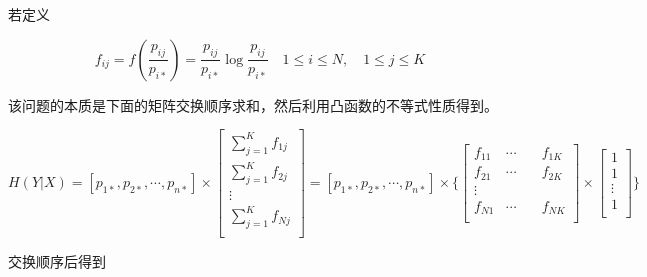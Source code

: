 \begin{remark}
    若定义

    \begin{equation*}
        f_{ij} = f(\frac{p_{ij}}{p_{i*}}) = \frac{p_{ij}}{p_{i*}} \log \frac{p_{ij}}{p_{i*}}\quad 1 \leq i \leq N,\quad 1 \leq j \leq K
    \end{equation*}

    该问题的本质是下面的矩阵交换顺序求和，然后利用凸函数的不等式性质得到。

    \begin{equation*}
        H(Y|X) = [p_{1*}, p_{2*},\cdots, p_{n*}] \times \left[
            \begin{aligned}
                \sum_{j=1}^K f_{1j} \\
                \sum_{j=1}^K f_{2j} \\
                \vdots              \\
                \sum_{j=1}^K f_{Nj} \\
            \end{aligned}
            \right]
        = [p_{1*}, p_{2*},\cdots, p_{n*}] \times \Bigg\{
        \left[
            \begin{aligned}
                f_{11} & \cdots & \quad f_{1K} \\
                f_{21} & \cdots & \quad f_{2K} \\
                \vdots                         \\
                f_{N1} & \cdots & \quad f_{NK} \\
            \end{aligned}
            \right] \times
        \left[
            \begin{aligned}
                1      \\
                1      \\
                \vdots \\
                1      \\
            \end{aligned}
            \right]
        \Bigg\}
    \end{equation*}

    交换顺序后得到


\end{remark}
